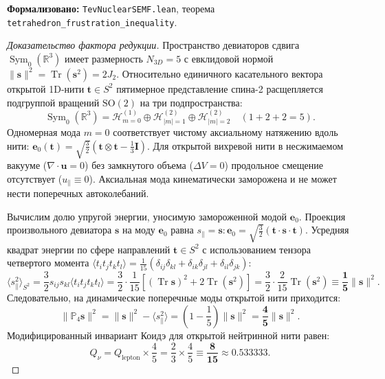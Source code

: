 \documentclass[11pt,a4paper]{article}
\theoremstyle{definition}
\theoremstyle{remark}
\begin{document}
\noindent\small\textbf{Формализовано:} \texttt{TevNuclearSEMF.lean}, теорема \texttt{tetrahedron_frustration_inequality}.
	
\begin{proof}[Доказательство фактора редукции]
Пространство девиаторов сдвига $\operatorname{Sym}_0(\mathbb{R}^3)$ имеет размерность $N_{3D} = 5$ с евклидовой нормой $\|\mathbf{s}\|^2 = \operatorname{Tr}(\mathbf{s}^2) = 2J_2$. Относительно единичного касательного вектора открытой 1D-нити $\mathbf{t} \in S^2$ пятимерное представление спина-2 расщепляется подгруппой вращений $\mathrm{SO}(2)$ на три подпространства:
\begin{equation}
    \operatorname{Sym}_0(\mathbb{R}^3) = \mathcal{H}_{m=0}^{(1)} \oplus \mathcal{H}_{|m|=1}^{(2)} \oplus \mathcal{H}_{|m|=2}^{(2)} \quad (1 + 2 + 2 = 5).
\end{equation}
Одномерная мода $m=0$ соответствует чистому аксиальному натяжению вдоль нити: $\mathbf{e}_0(\mathbf{t}) = \sqrt{\frac{3}{2}}(\mathbf{t} \otimes \mathbf{t} - \frac{1}{3}\mathbf{I})$. Для открытой вихревой нити в несжимаемом вакууме ($\nabla \cdot \mathbf{u} = 0$) без замкнутого объема ($\Delta V = 0$) продольное смещение отсутствует ($u_\parallel \equiv 0$). Аксиальная мода кинематически заморожена и не может нести поперечных автоколебаний.

Вычислим долю упругой энергии, уносимую замороженной модой $\mathbf{e}_0$. Проекция произвольного девиатора $\mathbf{s}$ на моду $\mathbf{e}_0$ равна $s_\parallel = \mathbf{s} : \mathbf{e}_0 = \sqrt{\frac{3}{2}}(\mathbf{t} \cdot \mathbf{s} \cdot \mathbf{t})$. Усредняя квадрат энергии по сфере направлений $\mathbf{t} \in S^2$ с использованием тензора четвертого момента $\langle t_i t_j t_k t_l \rangle = \frac{1}{15}(\delta_{ij}\delta_{kl} + \delta_{ik}\delta_{jl} + \delta_{il}\delta_{jk})$:
\begin{equation}
    \langle s_\parallel^2 \rangle_{S^2} = \frac{3}{2} s_{ij} s_{kl} \langle t_i t_j t_k t_l \rangle = \frac{3}{2} \cdot \frac{1}{15} \left[ (\operatorname{Tr}\mathbf{s})^2 + 2\operatorname{Tr}(\mathbf{s}^2) \right] = \frac{3}{2} \cdot \frac{2}{15} \operatorname{Tr}(\mathbf{s}^2) \equiv \frac{\mathbf{1}}{\mathbf{5}} \|\mathbf{s}\|^2.
    \label{eq:axial_mode_one_fifth_exact}
\end{equation}
Следовательно, на динамические поперечные моды открытой нити приходится:
\begin{equation}
    \|\mathbb{P}_4 \mathbf{s}\|^2 = \|\mathbf{s}\|^2 - \langle s_\parallel^2 \rangle = \left( 1 - \frac{1}{5} \right) \|\mathbf{s}\|^2 = \frac{\mathbf{4}}{\mathbf{5}} \|\mathbf{s}\|^2.
\end{equation}
Модифицированный инвариант Коидэ для открытой нейтринной нити равен:
\begin{equation}
    Q_\nu = Q_{\mathrm{lepton}} \times \frac{4}{5} = \frac{2}{3} \times \frac{4}{5} \equiv \frac{\mathbf{8}}{\mathbf{15}} \approx 0.533333.
\end{equation}
\end{proof}
	
\end{document}
